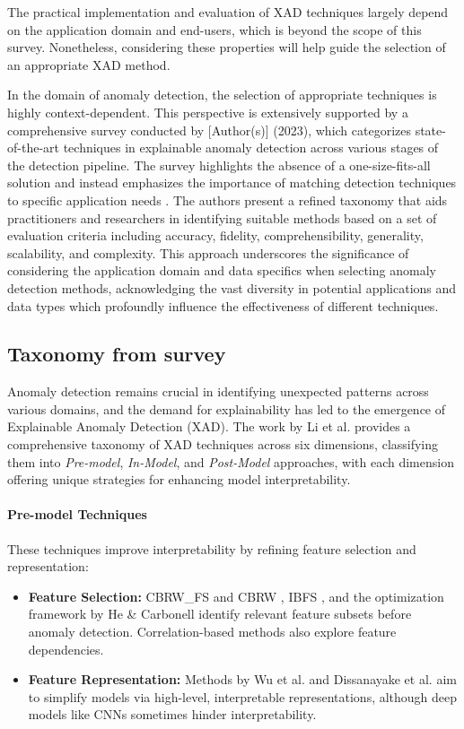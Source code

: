 The practical implementation and evaluation of XAD techniques largely depend on the application domain and end-users, which is beyond the scope of this survey. Nonetheless, considering these properties will help guide the selection of an appropriate XAD method.

In the domain of anomaly detection, the selection of appropriate techniques is highly context-dependent. This perspective is extensively supported by a comprehensive survey conducted by [Author(s)] (2023), which categorizes state-of-the-art techniques in explainable anomaly detection across various stages of the detection pipeline. The survey highlights the absence of a one-size-fits-all solution and instead emphasizes the importance of matching detection techniques to specific application needs \cite{Li2023}. The authors present a refined taxonomy that aids practitioners and researchers in identifying suitable methods based on a set of evaluation criteria including accuracy, fidelity, comprehensibility, generality, scalability, and complexity. This approach underscores the significance of considering the application domain and data specifics when selecting anomaly detection methods, acknowledging the vast diversity in potential applications and data types which profoundly influence the effectiveness of different techniques.

\subsection{Taxonomy from survey}
Anomaly detection remains crucial in identifying unexpected patterns across various domains, and the demand for explainability has led to the emergence of Explainable Anomaly Detection (XAD). The work by Li et al. \cite{10} provides a comprehensive taxonomy of XAD techniques across six dimensions, classifying them into \textit{Pre-model}, \textit{In-Model}, and \textit{Post-Model} approaches, with each dimension offering unique strategies for enhancing model interpretability.

\paragraph{Pre-model Techniques}
These techniques improve interpretability by refining feature selection and representation:
\begin{itemize}
    \item \textbf{Feature Selection:} CBRW\_FS and CBRW \cite{156,158}, IBFS \cite{223}, and the optimization framework by He \& Carbonell \cite{82} identify relevant feature subsets before anomaly detection. Correlation-based methods \cite{154,167} also explore feature dependencies.
    \item \textbf{Feature Representation:} Methods by Wu et al. \cite{219} and Dissanayake et al. \cite{60} aim to simplify models via high-level, interpretable representations, although deep models like CNNs sometimes hinder interpretability.
\end{itemize}

